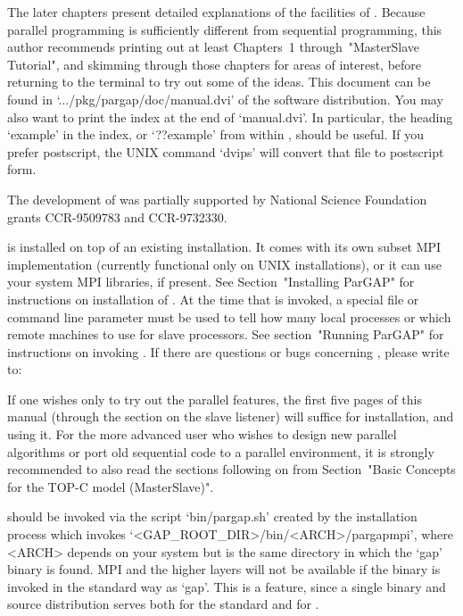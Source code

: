 \endlist

The later chapters present detailed explanations  of  the  facilities  of
{\ParGAP}. Because parallel programming is  sufficiently  different  from
sequential programming, this author  recommends  printing  out  at  least
Chapters~1 through~"MasterSlave Tutorial",  and  skimming  through  those
chapters for areas of interest, before returning to the terminal  to  try
out   some   of   the   ideas.   This   document   can   be   found    in
`.../pkg/pargap/doc/manual.dvi' of the  software  distribution.  You  may
also want to print the index at the end of `manual.dvi'.  In  particular,
the heading `example' in the index, or `??example'  from  within  {\GAP},
should be useful. If you prefer postscript, the UNIX command `dvips' will
convert that file to postscript form.

The development of {\ParGAP} was partially supported by National  Science
Foundation grants CCR-9509783 and CCR-9732330.


{\ParGAP} is installed on top of an existing {\GAP} installation. It 
comes with its own subset MPI implementation (currently functional only on 
UNIX installations), or it can use your system MPI libraries, if present. 
See Section~"Installing  ParGAP" for instructions on installation of {\ParGAP}. 
At the time that {\ParGAP} is invoked, a special file or command line 
parameter must be used to tell {\ParGAP}  how many local processes or which 
remote machines to use for slave processors. See section~"Running ParGAP" for 
instructions on invoking {\ParGAP}. If there are  questions  or  bugs
concerning {\ParGAP}, please write to: 

If one wishes only to try out the parallel features, the first five pages
of this manual (through the section on the slave listener)  will  suffice
for installation, and using it. For the more advanced user who wishes  to
design new parallel algorithms or port old sequential code to a  parallel
environment, it  is  strongly  recommended  to  also  read  the  sections
following  on  from  Section~"Basic  Concepts   for   the   TOP-C   model
(MasterSlave)".

{\ParGAP} should be invoked via the script `bin/pargap.sh' created by the
installation process which invokes `<GAP_ROOT_DIR>/bin/<ARCH>/pargapmpi',
where <ARCH> depends on your system but is the same  directory  in  which
the `gap' binary is  found.  MPI  and  the  higher  layers  will  not  be
available if the binary is invoked in the standard way as `gap'. This  is
a feature, since a single binary and source distribution serves both  for
the standard {\GAP} and for {\ParGAP}.

